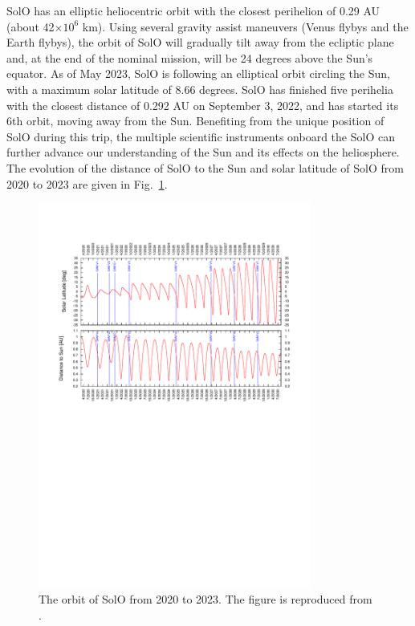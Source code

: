 
\ac{SolO} has an elliptic heliocentric orbit with the closest perihelion of 0.29 AU (about 42$\times10^6$ km). Using several gravity assist maneuvers (Venus flybys and the Earth flybys), the orbit of \ac{SolO} will gradually tilt away from the ecliptic plane and, at the end of the nominal mission, will be 24 degrees above the Sun's equator. As of May 2023, \ac{SolO} is following an elliptical orbit circling the Sun, with a maximum solar latitude of 8.66 degrees. \ac{SolO} has finished five perihelia with the closest distance of 0.292 AU on September 3, 2022, and has started its 6th orbit, moving away from the Sun. Benefiting from the unique position of \ac{SolO} during this trip, the multiple scientific instruments onboard the \ac{SolO} can further advance our understanding of the Sun and its effects on the heliosphere. The evolution of the distance of \ac{SolO} to the Sun and solar latitude of \ac{SolO} from 2020 to 2023 are given in Fig.~\ref{figL:SOLO_orbit_muller}.
\begin{figure}[ht]
    \centering
    \includegraphics[width=0.8\textwidth]{images/Muller2020-fig28.pdf}
    \caption[The orbit of \ac{SolO} between 2020-2030]{The orbit of \ac{SolO} from 2020 to 2023. The figure is reproduced from \citet{Mueller-2020-SolO}.}
    \label{figL:SOLO_orbit_muller}
\end{figure}


